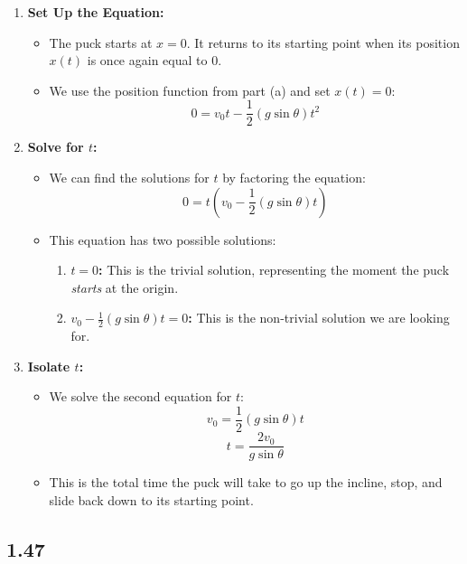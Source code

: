 \documentclass[11pt, a4paper]{article} %
\begin{document}
\begin{enumerate}
    \item \textbf{Set Up the Equation:}
    \begin{itemize}
        \item The puck starts at $x=0$. It returns to its starting point when its position $x(t)$ is once again equal to $0$.
        \item We use the position function from part (a) and set $x(t) = 0$:
        $$0 = v_0 t - \frac{1}{2} (g \sin\theta) t^2$$
    \end{itemize}

    \item \textbf{Solve for $t$:}
    \begin{itemize}
        \item We can find the solutions for $t$ by factoring the equation:
        $$0 = t \left( v_0 - \frac{1}{2} (g \sin\theta) t \right)$$
        \item This equation has two possible solutions:
        \begin{enumerate}
            \item \textbf{$t = 0$:} This is the trivial solution, representing the moment the puck \textit{starts} at the origin.
            \item \textbf{$v_0 - \frac{1}{2} (g \sin\theta) t = 0$:} This is the non-trivial solution we are looking for.
        \end{enumerate}
    \end{itemize}

    \item \textbf{Isolate $t$:}
    \begin{itemize}
        \item We solve the second equation for $t$:
        $$v_0 = \frac{1}{2} (g \sin\theta) t$$
        $$t = \frac{2 v_0}{g \sin\theta}$$
        \item This is the total time the puck will take to go up the incline, stop, and slide back down to its starting point.
    \end{itemize}
\end{enumerate}

\newpage
\subsection*{1.47}
\end{document}
